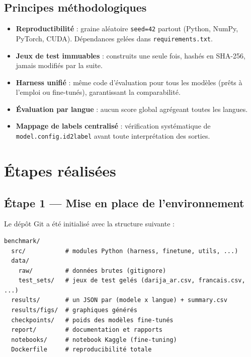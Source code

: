 \documentclass[12pt, a4paper]{article}
\begin{document}
\subsection{Principes méthodologiques}

\begin{itemize}
  \item \textbf{Reproductibilité} : graine aléatoire \texttt{seed=42} partout
    (Python, NumPy, PyTorch, CUDA). Dépendances gelées dans \texttt{requirements.txt}.
  \item \textbf{Jeux de test immuables} : construits une seule fois, hashés en
    SHA-256, jamais modifiés par la suite.
  \item \textbf{Harness unifié} : même code d'évaluation pour tous les modèles
    (prêts à l'emploi ou fine-tunés), garantissant la comparabilité.
  \item \textbf{Évaluation par langue} : aucun score global agrégeant toutes les langues.
  \item \textbf{Mappage de labels centralisé} : vérification systématique de
    \texttt{model.config.id2label} avant toute interprétation des sorties.
\end{itemize}

\section{Étapes réalisées}

\subsection{Étape 1 — Mise en place de l'environnement}

Le dépôt Git a été initialisé avec la structure suivante :

\begin{lstlisting}
benchmark/
  src/           # modules Python (harness, finetune, utils, ...)
  data/
    raw/         # données brutes (gitignore)
    test_sets/   # jeux de test gelés (darija_ar.csv, francais.csv, ...)
  results/       # un JSON par (modele x langue) + summary.csv
  results/figs/  # graphiques générés
  checkpoints/   # poids des modèles fine-tunés
  report/        # documentation et rapports
  notebooks/     # notebook Kaggle (fine-tuning)
  Dockerfile     # reproducibilité totale
\end{lstlisting}
\end{document}
